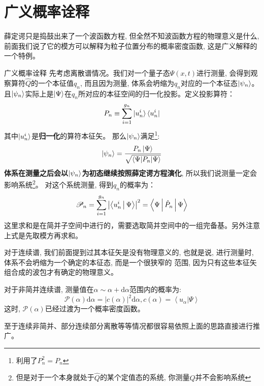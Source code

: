 \documentclass[a4paper,zihao=-4,linespread=1]{ctexrep}
\begin{document}
    \section{广义概率诠释}
    薛定谔只是捣鼓出来了一个波函数方程, 但全然不知波函数方程的物理意义是什么, 前面我们说了它的模方可以解释为粒子位置分布的概率密度函数, 这是广义解释的一个特例。
    \begin{proposition}{广义概率诠释}
        \setlength\parindent{2em}先考虑离散谱情况。我们对一个量子态$\Psi(x,t)$进行测量, 会得到观察算符$\hat{Q}$的一个本征值$q_n$, 而且因为测量, 体系会坍缩为$q_n$对应的一个本征态$\ket{\psi_n}$。
        且$\ket{\psi_n}$实际上是$\ket{\Psi}$在$q_n$所对应的本征空间的归一化投影。定义投影算符：
        \[P_n\equiv\sum\limits_{i=1}^{g_n} \ket{u_n^i} \bra{u_n^i}\]
        其中$\ket{u_n^i}$是\textbf{归一化}的算符本征矢。
        那么$\ket{\psi_n}$满足\footnote{利用了$P_n^2=P_n$}:
        \begin{equation}
            \ket{\psi_n}=\frac{P_n\ket{\Psi}}{\sqrt{\braket{\Psi|P_n|\Psi}}}
        \end{equation}
        \textbf{体系在测量之后会以$\ket{\psi_n}$为初态继续按照薛定谔方程演化}, 所以我们说测量一定会影响系统\footnote{但是对于一个本身就处于$\hat Q$的某个定值态的系统, 你测量$Q$并不会影响系统}。
        对这个系统测量, 得到$q_n$的概率为：
        \begin{equation}
        	\label{eq:3.13}
            \mathscr{P}_n=\sum\limits_{i=1}^{g_n}\left|\Braket{u_n^i|\Psi}\right|^2=\Braket{\Psi|\hat{P}_n|\Psi}
        \end{equation}
        这里求和是在简并子空间中进行的，需要选取简并空间中的一组完备基。另外注意上式是先取模方再求和。
        
        \setlength\parindent{2em}对于连续谱, 我们前面提到过其本征矢是没有物理意义的, 也就是说, 进行测量时, 体系不会坍缩为一个确定的本征态, 而是一个很狭窄的
        范围, 因为只有这些本征矢组合成的波包才有确定的物理意义。

        \setlength\parindent{2em}对于非简并连续谱, 测量值在$\alpha\sim\alpha+\mathrm{d}\alpha$范围内的概率为:
        \begin{equation}
            \mathscr{P}(\alpha)\mathrm{d}\alpha=\left|c(\alpha)\right|^2\mathrm{d}\alpha,c(\alpha)=\left \langle u_\alpha  | \Psi  \right \rangle 
        \end{equation}
        这时, $\mathscr{P}(\alpha)$已经过渡为一个概率密度函数。

        \setlength\parindent{2em}至于连续非简并、部分连续部分离散等等情况都很容易依照上面的思路直接进行推广。
    \end{proposition}
\end{document}

